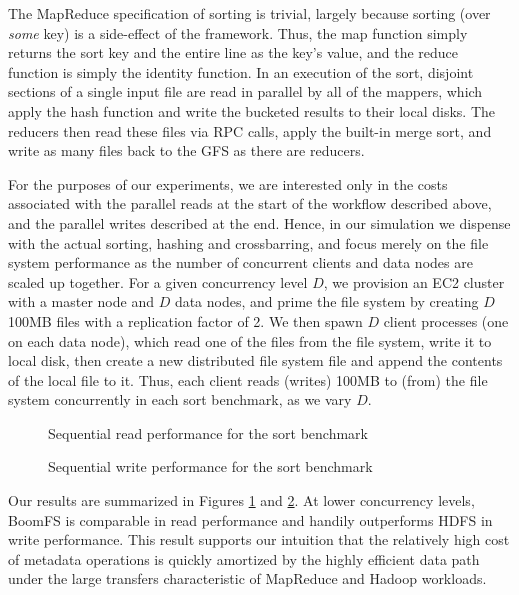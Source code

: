 \documentclass[twocolumn]{article}
\begin{document}
The MapReduce specification of sorting is trivial, largely because
sorting (over \emph{some} key) is a side-effect of the framework.
Thus, the map function simply returns the sort key and the entire line
as the key's value, and the reduce function is simply the identity
function.  In an execution of the sort, disjoint sections of a single
input file are read in parallel by all of the mappers, which apply the
hash function and write the bucketed results to their local disks.
The reducers then read these files via RPC calls, apply the built-in
merge sort, and write as many files back to the GFS as there are
reducers.

For the purposes of our experiments, we are interested only in the
costs associated with the parallel reads at the start of the workflow
described above, and the parallel writes described at the end.  Hence,
in our simulation we dispense with the actual sorting, hashing and
crossbarring, and focus merely on the file system performance as the
number of concurrent clients and data nodes are scaled up together.
For a given concurrency level $D$, we provision an EC2 cluster with a
master node and $D$ data nodes, and prime the file system by creating
$D$ 100MB files with a replication factor of 2.  We then spawn $D$
client processes (one on each data node), which read one of the files
from the file system, write it to local disk, then create a new
distributed file system file and append the contents of the local file
to it.  Thus, each client reads (writes) 100MB to (from) the
file system concurrently in each sort benchmark, as we vary $D$.

\begin{figure}
\centering
{}
\caption{Sequential read performance for the sort benchmark}
\label{fig:big-read-perf}
\end{figure}
\begin{figure}
\centering
{}
\caption{Sequential write performance for the sort benchmark}
\label{fig:big-write-perf}
\end{figure}
Our results are summarized in Figures \ref{fig:big-read-perf} and
\ref{fig:big-write-perf}.  At lower concurrency levels, BoomFS is
comparable in read performance and handily outperforms HDFS in write
performance.  This result supports our intuition that the relatively
high cost of metadata operations is quickly amortized by the highly
efficient data path under the large transfers characteristic of
MapReduce and Hadoop workloads.
\end{document}
